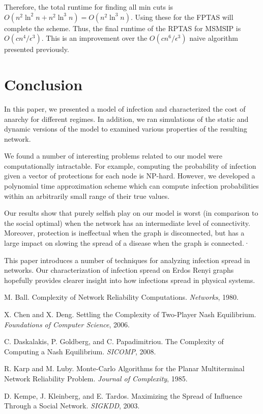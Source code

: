 \documentclass{article}
\theoremstyle{plain}
\begin{document}
Therefore, the total runtime for finding all min cuts is $O(n^2 \ln^2 n + n^2 \ln^3 n) = O(n^2 \ln^3 n)$. Using these for the FPTAS will complete the scheme. Thus, the final runtime of the RPTAS for MSMSIP is $O(c n^4 / \epsilon^3)$. This is an improvement over the $O(c n^6 / \epsilon^3)$ naive algorithm presented previously.

\section{Conclusion}

In this paper, we presented a model of infection and characterized the cost of anarchy for different regimes. In addition, we ran simulations of the static and dynamic versions of the model to examined various properties of the resulting network.

We found a number of interesting problems related to our model were computationally intractable. For example, computing the probability of infection given a vector of protections for each node is NP-hard. However, we developed a polynomial time approximation scheme which can compute infection probabilities within an arbitrarily small range of their true values.

Our results show that purely selfish play on our model is worst (in comparison to the social optimal) when the network has an intermediate level of connectivity. Moreover, protection is ineffectual when the graph is disconnected, but has a large impact on slowing the spread of a disease when the graph is connected.·

This paper introduces a number of techniques for analyzing infection spread in networks. Our characterization of infection spread on Erdos Renyi graphs hopefully provides clearer insight into how infections spread in physical systems.

\newpage

\begin{thebibliography}{9}

    M. Ball.
    Complexity of Network Reliability Computations.
    \emph{Networks}, 1980.

    X. Chen and X. Deng.
    Settling the Complexity of Two-Player Nash Equilibrium.
    \emph{Foundations of Computer Science}, 2006.

    C. Daskalakis, P. Goldberg, and C. Papadimitriou.
    The Complexity of Computing a Nash Equilibrium.
    \emph{SICOMP}, 2008.

    R. Karp and M. Luby.
    Monte-Carlo Algorithms for the Planar Multiterminal Network Reliability Problem.
    \emph{Journal of Complexity}, 1985.

    D. Kempe, J. Kleinberg, and E. Tardos.
    Maximizing the Spread of Inﬂuence Through a Social Network.
    \emph{SIGKDD}, 2003.


\end{thebibliography}
\end{document}
